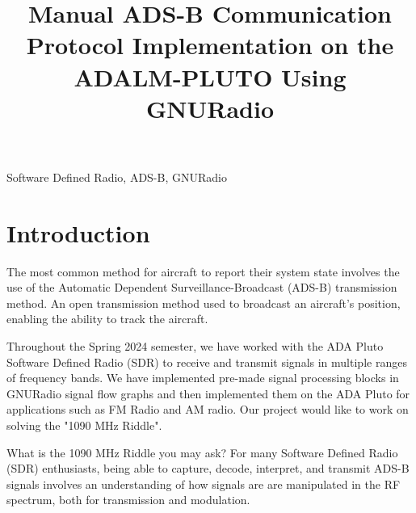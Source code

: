 \documentclass[conference]{IEEEtran}
\begin{document}
\title{Manual ADS-B Communication Protocol Implementation on the ADALM-PLUTO Using GNURadio}

\author{
\and
}

\maketitle

\begin{IEEEkeywords}
  Software Defined Radio, ADS-B, GNURadio
\end{IEEEkeywords}

\begin{abstract}

 

\end{abstract}



\section{Introduction}
The most common method for aircraft to report their system state involves the use of the Automatic Dependent Surveillance-Broadcast (ADS-B) transmission method. An open transmission method used to broadcast an aircraft's position, enabling the ability to track the aircraft.

Throughout the Spring 2024 semester, we have worked with the ADA Pluto Software Defined Radio (SDR) to receive and transmit signals in multiple ranges of frequency bands. We have implemented pre-made signal processing blocks in GNURadio signal flow graphs and then implemented them on the ADA Pluto for applications such as FM Radio and AM radio. Our project would like to work on solving the "1090 MHz Riddle".

What is the 1090 MHz Riddle you may ask? For many Software Defined Radio (SDR) enthusiasts, being able to capture, decode, interpret, and transmit ADS-B signals involves an understanding of how signals are are manipulated in the RF spectrum, both for transmission and modulation.
\end{document}
